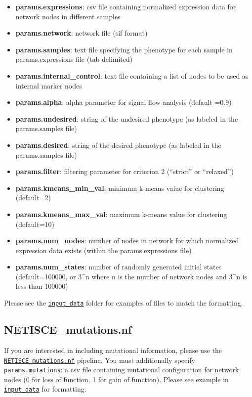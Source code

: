 \documentclass[
]{book}
\providecommand{\tightlist}{%
  \setlength{\itemsep}{0pt}\setlength{\parskip}{0pt}}
\begin{document}
\begin{itemize}
\tightlist
\item
  \textbf{params.expressions}: csv file containing normalized expression data for network nodes in different samples
\item
  \textbf{params.network}: network file (sif format)
\item
  \textbf{params.samples}: text file specifying the phenotype for each sample in params.expressions file (tab delimited)
\item
  \textbf{params.internal\_control}: text file containing a list of nodes to be used as internal marker nodes
\item
  \textbf{params.alpha}: alpha parameter for signal flow analysis (default =0.9)
\item
  \textbf{params.undesired}: string of the undesired phenotype (as labeled in the params.samples file)
\item
  \textbf{params.desired}: string of the desired phenotype (as labeled in the params.samples file)
\item
  \textbf{params.filter}: filtering parameter for criterion 2 (``strict'' or ``relaxed'')
\item
  \textbf{params.kmeans\_min\_val}: minimum k-means value for clustering (default=2)
\item
  \textbf{params.kmeans\_max\_val}: maximum k-means value for clustering (default=10)
\item
  \textbf{params.num\_nodes}: number of nodes in network for which normalized expression data exists (within the params.expressions file)
\item
  \textbf{params.num\_states}: number of randomly generated initial states (default=100000, or 3\^{}n where n is the number of network nodes and 3\^{}n is less than 100000)
\end{itemize}

Please see the \href{https://github.com/VeraLiconaResearchGroup/Netisce/tree/main/NETISCE_local/input_data}{\texttt{input\_data}} folder for examples of files to match the formatting.

\hypertarget{netisce_mutations.nf}{%
\subsection{NETISCE\_mutations.nf}\label{netisce_mutations.nf}}

If you are interested in including mutational information, please use the \href{https://github.com/VeraLiconaResearchGroup/Netisce/blob/main/NETISCE_local/NETISCE_mutations.nf}{\texttt{NETISCE\_mutations.nf}} pipeline. You must additionally specify \texttt{params.mutations}: a csv file containing mutational configuration for network nodes (0 for loss of function, 1 for gain of function). Please see example in \href{https://github.com/VeraLiconaResearchGroup/Netisce/tree/main/NETISCE_local/input_data}{\texttt{input\_data}} for formatting.
\end{document}
